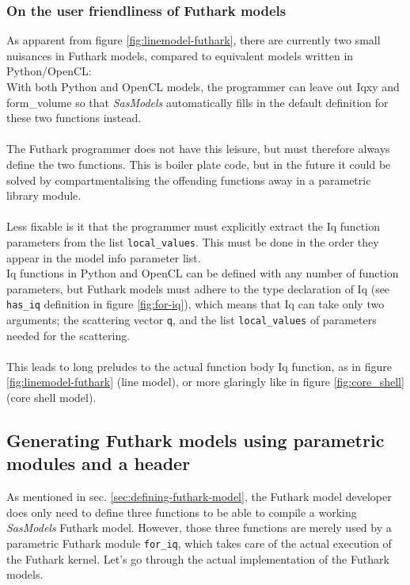 \documentclass[11pt]{article}
\newcommand{\sasmodels}{\textit{SasModels}}
\newcommand{\foriq}{\texttt{for\_iq}}
\begin{document}
\subsubsection{On the user friendliness of Futhark models}
As apparent from figure \ref{fig:linemodel-futhark}, there are currently two small 
nuisances in Futhark models, compared to equivalent models written in
Python/OpenCL:
\\
With both Python and OpenCL models, the programmer can leave out Iqxy and 
form\_volume so that \sasmodels{} automatically fills in the default definition
for these two functions instead.
\\\\
The Futhark programmer does not have this leisure, but must therefore always
define the two functions. This is boiler plate code, but in the future it could
be solved by compartmentalising the offending functions away in a
parametric library module.
\\\\
Less fixable is it that the programmer must explicitly extract the
Iq function parameters from the list \texttt{local\_values}. This must be done
in the order they appear in the model info parameter list.
\\
Iq functions in Python and OpenCL can be defined with any number of function 
parameters, but Futhark models must adhere to the type declaration of Iq 
(see \texttt{has\_iq} definition in figure \ref{fig:for-iq}), which means that Iq can 
take only two arguments; the scattering vector \texttt{q}, and the list 
\texttt{local\_values} of parameters needed for the scattering.
\\\\
This leads to long preludes to the actual function body Iq function, as in
figure \ref{fig:linemodel-futhark} (line model), or more glaringly like in
figure \ref{fig:core_shell} (core shell model).

\subsection{Generating Futhark models using parametric modules and a header}
\label{sec:generating-futhark}
As mentioned in sec. \ref{sec:defining-futhark-model}, the Futhark model developer
does only need to define three functions to be able to compile a working 
\sasmodels{} Futhark model.
However, those three functions are merely used by a parametric Futhark module 
\foriq{}, which takes care of the actual execution of the 
Futhark kernel.
Let's go through the actual implementation of the Futhark models.
\end{document}
